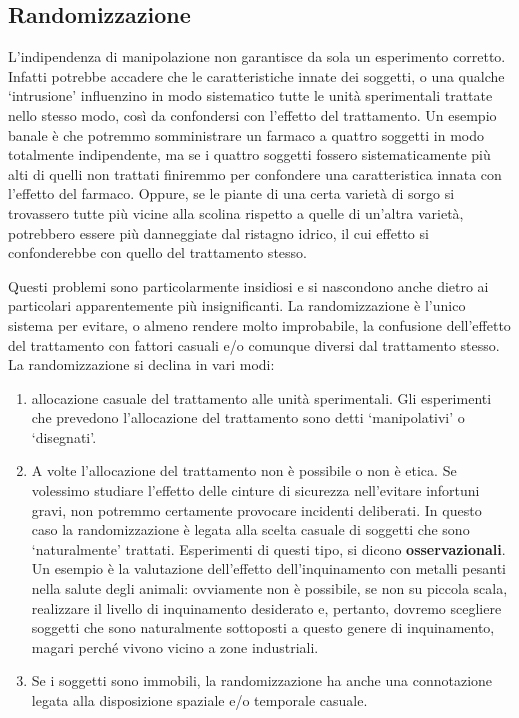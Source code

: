\documentclass[
  12pt,
]{book}
\providecommand{\tightlist}{%
  \setlength{\itemsep}{0pt}\setlength{\parskip}{0pt}}
\begin{document}
\hypertarget{randomizzazione}{%
\subsection{Randomizzazione}\label{randomizzazione}}

L'indipendenza di manipolazione non garantisce da sola un esperimento corretto. Infatti potrebbe accadere che le caratteristiche innate dei soggetti, o una qualche `intrusione' influenzino in modo sistematico tutte le unità sperimentali trattate nello stesso modo, così da confondersi con l'effetto del trattamento. Un esempio banale è che potremmo somministrare un farmaco a quattro soggetti in modo totalmente indipendente, ma se i quattro soggetti fossero sistematicamente più alti di quelli non trattati finiremmo per confondere una caratteristica innata con l'effetto del farmaco. Oppure, se le piante di una certa varietà di sorgo si trovassero tutte più vicine alla scolina rispetto a quelle di un'altra varietà, potrebbero essere più danneggiate dal ristagno idrico, il cui effetto si confonderebbe con quello del trattamento stesso.

Questi problemi sono particolarmente insidiosi e si nascondono anche dietro ai particolari apparentemente più insignificanti. La randomizzazione è l'unico sistema per evitare, o almeno rendere molto improbabile, la confusione dell'effetto del trattamento con fattori casuali e/o comunque diversi dal trattamento stesso. La randomizzazione si declina in vari modi:

\begin{enumerate}
\def\labelenumi{\arabic{enumi}.}
\tightlist
\item
  allocazione casuale del trattamento alle unità sperimentali. Gli esperimenti che prevedono l'allocazione del trattamento sono detti `manipolativi' o `disegnati'.
\item
  A volte l'allocazione del trattamento non è possibile o non è etica. Se volessimo studiare l'effetto delle cinture di sicurezza nell'evitare infortuni gravi, non potremmo certamente provocare incidenti deliberati. In questo caso la randomizzazione è legata alla scelta casuale di soggetti che sono `naturalmente' trattati. Esperimenti di questi tipo, si dicono \textbf{osservazionali}. Un esempio è la valutazione dell'effetto dell'inquinamento con metalli pesanti nella salute degli animali: ovviamente non è possibile, se non su piccola scala, realizzare il livello di inquinamento desiderato e, pertanto, dovremo scegliere soggetti che sono naturalmente sottoposti a questo genere di inquinamento, magari perché vivono vicino a zone industriali.
\item
  Se i soggetti sono immobili, la randomizzazione ha anche una connotazione legata alla disposizione spaziale e/o temporale casuale.
\end{enumerate}
\end{document}
